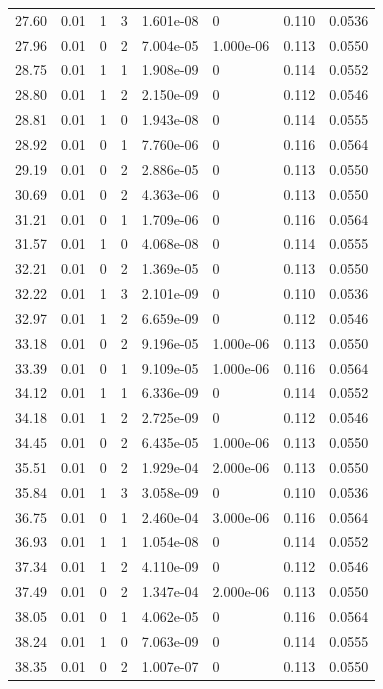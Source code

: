 \documentclass[preview]{standalone}
\begin{document}
{{{\begin{tabular}{L{1.2cm}C{1.2cm} C{0.3cm}C{0.5cm} C{1.4cm}C{1.4cm} C{1.4cm}C{1.4cm}}
  27.60  &  0.01  & 1     &  3 &  1.601e-08  & 0  & 0.110 &  0.0536   \\ 
  27.96  &  0.01  & 0     &  2 &  7.004e-05  & 1.000e-06  & 0.113 &  0.0550   \\ 
  28.75  &  0.01  & 1     &  1 &  1.908e-09  & 0  & 0.114 &  0.0552   \\ 
  28.80  &  0.01  & 1     &  2 &  2.150e-09  & 0  & 0.112 &  0.0546   \\ 
  28.81  &  0.01  & 1     &  0 &  1.943e-08  & 0  & 0.114 &  0.0555   \\ 
  28.92  &  0.01  & 0     &  1 &  7.760e-06  & 0  & 0.116 &  0.0564   \\ 
  29.19  &  0.01  & 0     &  2 &  2.886e-05  & 0  & 0.113 &  0.0550   \\ 
  30.69  &  0.01  & 0     &  2 &  4.363e-06  & 0  & 0.113 &  0.0550   \\ 
  31.21  &  0.01  & 0     &  1 &  1.709e-06  & 0  & 0.116 &  0.0564   \\ 
  31.57  &  0.01  & 1     &  0 &  4.068e-08  & 0  & 0.114 &  0.0555   \\ 
  32.21  &  0.01  & 0     &  2 &  1.369e-05  & 0  & 0.113 &  0.0550   \\ 
  32.22  &  0.01  & 1     &  3 &  2.101e-09  & 0  & 0.110 &  0.0536   \\ 
  32.97  &  0.01  & 1     &  2 &  6.659e-09  & 0  & 0.112 &  0.0546   \\ 
  33.18  &  0.01  & 0     &  2 &  9.196e-05  & 1.000e-06  & 0.113 &  0.0550   \\ 
  33.39  &  0.01  & 0     &  1 &  9.109e-05  & 1.000e-06  & 0.116 &  0.0564   \\ 
  34.12  &  0.01  & 1     &  1 &  6.336e-09  & 0  & 0.114 &  0.0552   \\ 
  34.18  &  0.01  & 1     &  2 &  2.725e-09  & 0  & 0.112 &  0.0546   \\ 
  34.45  &  0.01  & 0     &  2 &  6.435e-05  & 1.000e-06  & 0.113 &  0.0550   \\ 
  35.51  &  0.01  & 0     &  2 &  1.929e-04  & 2.000e-06  & 0.113 &  0.0550   \\ 
  35.84  &  0.01  & 1     &  3 &  3.058e-09  & 0  & 0.110 &  0.0536   \\ 
  36.75  &  0.01  & 0     &  1 &  2.460e-04  & 3.000e-06  & 0.116 &  0.0564   \\ 
  36.93  &  0.01  & 1     &  1 &  1.054e-08  & 0  & 0.114 &  0.0552   \\ 
  37.34  &  0.01  & 1     &  2 &  4.110e-09  & 0  & 0.112 &  0.0546   \\ 
  37.49  &  0.01  & 0     &  2 &  1.347e-04  & 2.000e-06  & 0.113 &  0.0550   \\ 
  38.05  &  0.01  & 0     &  1 &  4.062e-05  & 0  & 0.116 &  0.0564   \\ 
  38.24  &  0.01  & 1     &  0 &  7.063e-09  & 0  & 0.114 &  0.0555   \\ 
  38.35  &  0.01  & 0     &  2 &  1.007e-07  & 0  & 0.113 &  0.0550   \\ 
\hline 
\end{tabular} 

}}}
\end{document}
